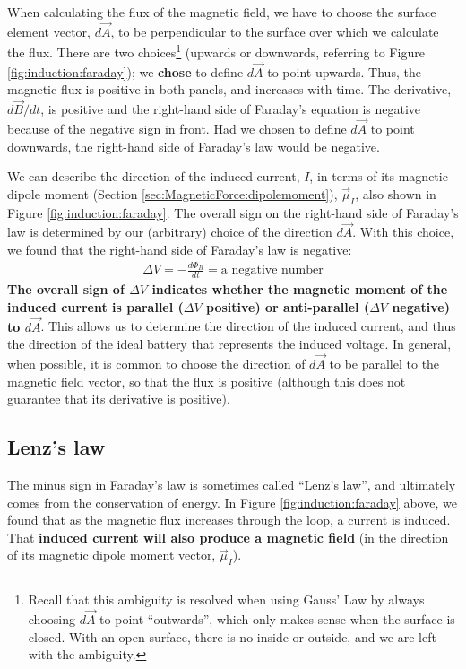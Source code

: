 When calculating the flux of the magnetic field, we have to choose the surface element vector, $d\vec A$, to be perpendicular to the surface over which we calculate the flux. There are two choices\footnote{Recall that this ambiguity is resolved when using Gauss' Law by always choosing $d\vec A$ to point ``outwards'', which only makes sense when the surface is closed. With an open surface, there is no inside or outside, and we are left with the ambiguity.} (upwards or downwards, referring to Figure \ref{fig:induction:faraday}); we \textbf{chose} to define $d\vec A$ to point upwards. Thus, the magnetic flux is positive in both panels, and increases with time. The derivative, $d\vec B/dt$, is positive and the right-hand side of Faraday's equation is negative because of the negative sign in front. Had we chosen to define $d\vec A$ to point downwards, the right-hand side of Faraday's law would be negative.

We can describe the direction of the induced current, $I$, in terms of its magnetic dipole moment (Section \ref{sec:MagneticForce:dipolemoment}), $\vec\mu_I$, also shown in Figure \ref{fig:induction:faraday}. The overall sign on the right-hand side of Faraday's law is determined by our (arbitrary) choice of the direction $d\vec A$. With this choice, we found that the right-hand side of Faraday's law is negative:
\begin{align*}
\Delta V = -\frac{d\Phi_B}{dt}=\text{a negative number}
\end{align*}
\textbf{The overall sign of $\Delta V$ indicates whether the magnetic moment of the induced current is parallel ($\Delta V$ positive) or anti-parallel ($\Delta V$ negative) to $d\vec A$}. This allows us to determine the direction of the induced current, and thus the direction of the ideal battery that represents the induced voltage. In general, when possible, it is common to choose the direction of $d\vec A$ to be parallel to the magnetic field vector, so that the flux is positive (although this does not guarantee that its derivative is positive).

\subsection{Lenz's law}
The minus sign in Faraday's law is sometimes called ``Lenz's law'', and ultimately comes from the conservation of energy. In Figure \ref{fig:induction:faraday} above, we found that as the magnetic flux increases through the loop, a current is induced. That \textbf{induced current will also produce a magnetic field} (in the direction of its magnetic dipole moment vector, $\vec \mu_I$).


